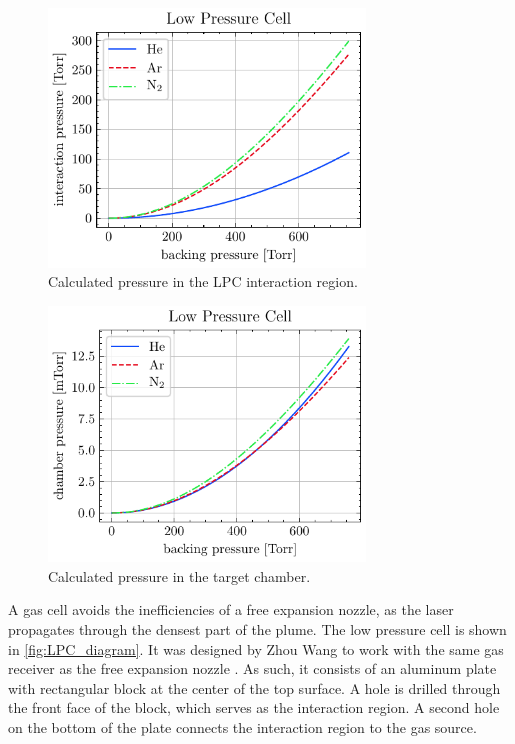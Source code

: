 \begin{figure}
	\centering
	\includegraphics[width=0.75\textwidth]{figures/chap3/LPC_interaction_p.pdf}
	\caption{Calculated pressure in the LPC interaction region.}
	\label{fig:LPC_interaction_p}
\end{figure}

\begin{figure}
	\centering
	\includegraphics[width=0.75\textwidth]{figures/chap3/LPC_chamber_p.pdf}
	\caption{Calculated pressure in the target chamber.}
	\label{fig:LPC_chamber_p}
\end{figure}

A gas cell avoids the inefficiencies of a free expansion nozzle, as the laser propagates through the densest part of the plume. The low pressure cell is shown in \cref{fig:LPC_diagram}. It was designed by Zhou Wang to work with the same gas receiver as the free expansion nozzle \cite{wangMidinfraredStrongfieldLaser2018}. As such, it consists of an aluminum plate with rectangular block at the center of the top surface. A hole is drilled through the front face of the block, which serves as the interaction region. A second hole on the bottom of the plate connects the interaction region to the gas source. 


